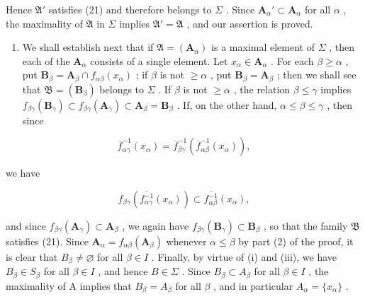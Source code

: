 Hence \(\mathfrak{A}'\) satisfies (21) and therefore belongs to \(\Sigma\) . Since \(\mathbf{A}_{\alpha}' \subset \mathbf{A}_{\alpha}\) for all \(\alpha\) , the maximality of \(\mathfrak{A}\) in \(\Sigma\) implies \(\mathfrak{A}' = \mathfrak{A}\) , and our assertion is proved.

\begin{enumerate}
\def\labelenumi{(\arabic{enumi})}
\setcounter{enumi}{2}
\tightlist
\item
  We shall establish next that if \(\mathfrak{A} = (\mathbf{A}_{\alpha})\) is a maximal element of \(\Sigma\) , then each of the \(\mathbf{A}_{\alpha}\) consists of a single element. Let \(x_{\alpha} \in \mathbf{A}_{\alpha}\) . For each \(\beta \geqslant \alpha\) , put \(\mathbf{B}_{\beta} = \mathbf{A}_{\beta} \cap f_{\alpha \beta}(x_{\alpha})\) ; if \(\beta\) is not \(\geqslant \alpha\) , put \(\mathbf{B}_{\beta} = \mathbf{A}_{\beta}\) ; then we shall see that \(\mathfrak{B} = (\mathbf{B}_{\beta})\) belongs to \(\Sigma\) . If \(\beta\) is not \(\geqslant \alpha\) , the relation \(\beta \leqslant \gamma\) implies \(f_{\beta \gamma}(\mathbf{B}_{\gamma}) \subset f_{\beta \gamma}(\mathbf{A}_{\gamma}) \subset \mathbf{A}_{\beta} = \mathbf{B}_{\beta}\) . If, on the other hand, \(\alpha \leqslant \beta \leqslant \gamma\) , then since
\end{enumerate}

\[
\overline {{f}} _ {\alpha \gamma} ^ {- 1} (x _ {\alpha}) = \overline {{f}} _ {\beta \gamma} ^ {- 1} (\overline {{f}} _ {\alpha \beta} ^ {- 1} (x _ {\alpha})),
\]

we have

\[
f _ {\beta \gamma} (\overline {{f _ {\alpha \gamma} ^ {- 1}}} (x _ {\alpha})) \subset \overline {{f _ {\alpha \beta} ^ {- 1}}} (x _ {\alpha}),
\]

and since \(f_{\beta \gamma}(\mathbf{A}_{\gamma}) \subset \mathbf{A}_{\beta}\) , we again have \(f_{\beta \gamma}(\mathbf{B}_{\gamma}) \subset \mathbf{B}_{\beta}\) , so that the family \(\mathfrak{B}\) satisfies (21). Since \(\mathbf{A}_{\alpha} = f_{\alpha \beta}(\mathbf{A}_{\beta})\) whenever \(\alpha \leqslant \beta\) by part (2) of the proof, it is clear that \(B_{\beta} \neq \varnothing\) for all \(\beta \in I\) . Finally, by virtue of (i) and (iii), we have \(B_{\beta} \in S_{\beta}\) for all \(\beta \in I\) , and hence \(B \in \Sigma\) . Since \(B_{\beta} \subset A_{\beta}\) for all \(\beta \in I\) , the maximality of A implies that \(B_{\beta} = A_{\beta}\) for all \(\beta\) , and in particular \(A_{\alpha} = \{x_{\alpha}\}\) .

